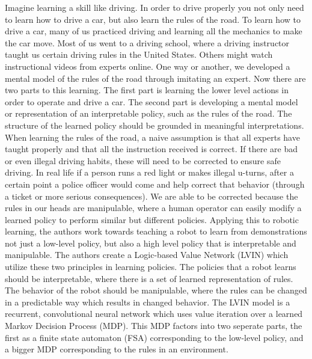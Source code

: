 \documentclass[letterpaper, 10 pt, conference]{ieeeconf}  %
\begin{document}
Imagine learning a skill like driving. In order to drive properly you not only need to learn how to drive a car, but also learn the rules of the road. To learn how to drive a car, many of us practiced driving and learning all the mechanics to make the car move. Most of us went to a driving school, where a driving instructor taught us certain driving rules in the United States. Others might watch instructional videos from experts online. One way or another, we developed a mental model of the rules of the road through imitating an expert. 
\newline
\indent Now there are two parts to this learning. The first part is learning the lower level actions in order to operate and drive a car. The second part is developing a mental model or representation of an interpretable policy, such as the rules of the road. The structure of the learned policy should be grounded in meaningful interpretations.
\newline
\indent When learning the rules of the road, a naive assumption is that all experts have taught properly and that all the instruction received is correct. If there are bad or even illegal driving habits, these will need to be corrected to ensure safe driving. In real life if a person runs a red light or makes illegal u-turns, after a certain point a police officer would come and help correct that behavior (through a ticket or more serious consequences). We are able to be corrected because the rules in our heads are manipulable, where a human operator can easily modify a learned policy to perform similar but different policies. 
\newline
\indent Applying this to robotic learning, the authors work towards teaching a robot to learn from demonstrations not just a low-level policy, but also a high level policy that is interpretable and manipulable. The authors create a Logic-based Value Network (LVIN) which utilize these two principles in learning policies. The policies that a robot learns should be interpretable, where there is a set of learned representation of rules. The behavior of the robot should be manipulable, where the rules can be changed in a predictable way which results in changed behavior. The LVIN model is a recurrent, convolutional neural network which uses value iteration over a learned Markov Decision Process (MDP). This MDP factors into two seperate parts, the first as a finite state automaton (FSA) corresponding to the low-level policy, and a bigger MDP corresponding to the rules in an environment.
\newline
\end{document}
